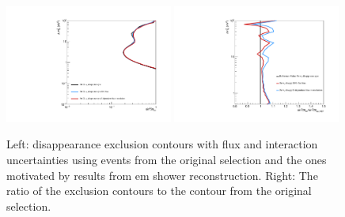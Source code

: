 \begin{figure}[h!]
    \centering
    \includegraphics[width = 0.49\textwidth]{figures-chap6/exclusion_contours/bias/nue_disapp_03d1.pdf}
    \includegraphics[width = 0.49\textwidth]{figures-chap6/exclusion_contours/bias/nue_disapp_03d1_ratio.pdf}
    \caption[\nue disappearance exclusion contours using events from the selection motivated by \gls{em} shower reconstruction.]{Left: \nue disappearance exclusion contours with flux and interaction uncertainties using events from the original selection and the ones motivated by results from \gls{em} shower reconstruction. Right: The ratio of the exclusion contours to the contour from the original selection.}
    \label{fig:nue_disapp_bias}
\end{figure}


